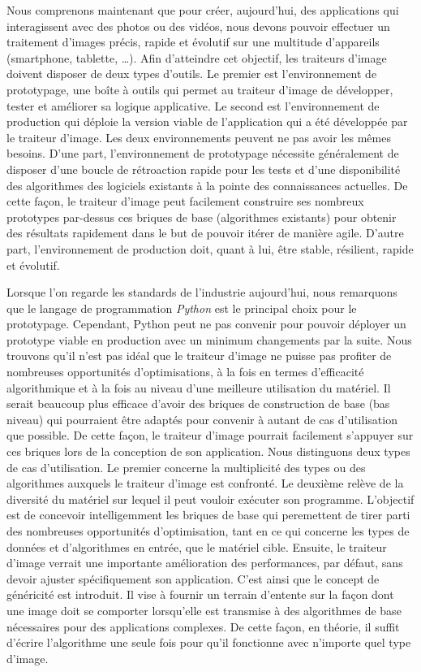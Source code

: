 Nous comprenons maintenant que pour créer, aujourd'hui, des applications qui interagissent avec des photos ou des
vidéos, nous devons pouvoir effectuer un traitement d'images précis, rapide et évolutif sur une multitude d'appareils
(smartphone, tablette, \ldots). Afin d'atteindre cet objectif, les traiteurs d'image doivent disposer de deux types
d'outils. Le premier est l'environnement de prototypage, une boîte à outils qui permet au traiteur d'image de
développer, tester et améliorer sa logique applicative. Le second est l'environnement de production qui déploie la
version viable de l'application qui a été développée par le traiteur d'image. Les deux environnements peuvent ne pas
avoir les mêmes besoins. D'une part, l'environnement de prototypage nécessite généralement de disposer d'une boucle de
rétroaction rapide pour les tests et d'une disponibilité des algorithmes des logiciels existants à la pointe des
connaissances actuelles. De cette façon, le traiteur d'image peut facilement construire ses nombreux prototypes
par-dessus ces briques de base (algorithmes existants) pour obtenir des résultats rapidement dans le but de pouvoir
itérer de manière agile. D'autre part, l'environnement de production doit, quant à lui, être stable, résilient, rapide
et évolutif.

Lorsque l'on regarde les standards de l'industrie aujourd'hui, nous remarquons que le langage de programmation
\emph{Python} est le principal choix pour le prototypage. Cependant, Python peut ne pas convenir pour pouvoir déployer
un prototype viable en production avec un minimum changements par la suite. Nous trouvons qu'il n'est pas idéal que le
traiteur d'image ne puisse pas profiter de nombreuses opportunités d'optimisations, à la fois en termes d'efficacité
algorithmique et à la fois au niveau d'une meilleure utilisation du matériel. Il serait beaucoup plus efficace d'avoir
des briques de construction de base (bas niveau) qui pourraient être adaptés pour convenir à autant de cas d'utilisation
que possible. De cette façon, le traiteur d'image pourrait facilement s'appuyer sur ces briques lors de la conception de
son application. Nous distinguons deux types de cas d'utilisation. Le premier concerne la multiplicité des types ou des
algorithmes auxquels le traiteur d'image est confronté. Le deuxième relève de la diversité du matériel sur lequel il
peut vouloir exécuter son programme. L'objectif est de concevoir intelligemment les briques de base qui peremettent de
tirer parti des nombreuses opportunités d'optimisation, tant en ce qui concerne les types de données et d'algorithmes en
entrée, que le matériel cible. Ensuite, le traiteur d'image verrait une importante amélioration des performances, par
défaut, sans devoir ajuster spécifiquement son application. C'est ainsi que le concept de généricité est introduit. Il
vise à fournir un terrain d'entente sur la façon dont une image doit se comporter lorsqu'elle est transmise à des
algorithmes de base nécessaires pour des applications complexes. De cette façon, en théorie, il suffit d'écrire
l'algorithme une seule fois pour qu'il fonctionne avec n'importe quel type d'image.

